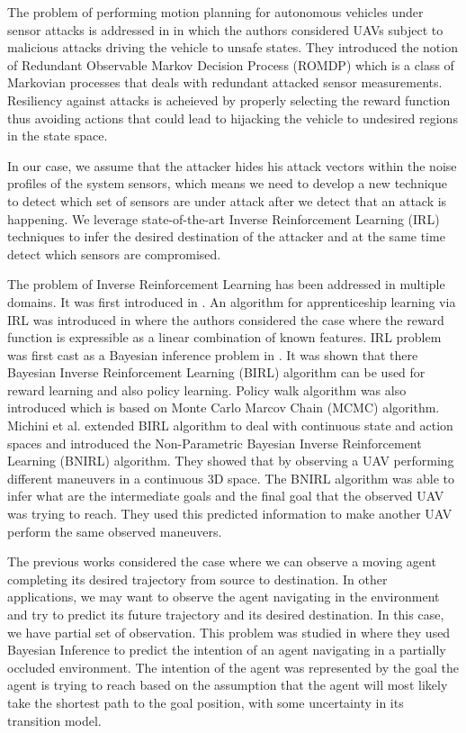 \documentclass[letterpaper, 10 pt, conference]{ieeeconf}  %
\begin{document}
The problem of performing motion planning for autonomous vehicles under sensor attacks is addressed in \cite{bezzo2016stochastic} in which the authors considered UAVs subject to malicious attacks driving the vehicle to unsafe states. They introduced the notion of Redundant Observable Markov Decision Process (ROMDP) which is a class of Markovian processes that deals with redundant attacked sensor measurements. Resiliency against attacks is acheieved by properly selecting the reward function thus avoiding actions that could lead to hijacking the vehicle to undesired regions in the state space.

In our case, we assume that the attacker hides his attack vectors within the noise profiles of the system sensors, which means we need to develop a new technique to detect which set of sensors are under attack after we detect that an attack is happening. We leverage state-of-the-art Inverse Reinforcement Learning (IRL) techniques to infer the desired destination of the attacker and at the same time detect which sensors are compromised.

The problem of Inverse Reinforcement Learning has been addressed in multiple domains. It was first introduced in \cite{Ng2000}. An algorithm for apprenticeship learning via IRL was introduced in \cite{Abbeel2004a} where the authors considered the case where the reward function is expressible as a linear combination of known features. IRL problem was first cast as a Bayesian inference problem in  \cite{Ramachandran2007}. It was shown that there Bayesian Inverse Reinforcement Learning (BIRL) algorithm can be used for reward learning and also policy learning. Policy walk algorithm was also introduced which is based on Monte Carlo Marcov Chain (MCMC) algorithm. Michini et al. \cite{Michini2015,Michini2013,Michini2012} extended BIRL algorithm to deal with continuous state and action spaces and introduced the Non-Parametric Bayesian Inverse Reinforcement Learning (BNIRL) algorithm. They  showed that by observing a UAV performing different maneuvers in a continuous 3D space. The BNIRL algorithm was able to infer what are the intermediate goals and the final goal that the observed UAV was trying to reach. They used this predicted information to make another UAV perform the same observed maneuvers.

The previous works considered the case where we can observe a moving agent completing its desired trajectory from source to destination. In other applications, we may want to observe the agent navigating in the environment and try to predict its future trajectory and its desired destination. In this case, we have partial set of observation. This problem was studied in \cite{Best2015} where they used Bayesian Inference to predict the intention of an agent navigating in a partially occluded environment. The intention of the agent was represented by the goal the agent is trying to reach based on the assumption that the agent will most likely take the shortest path to the goal position, with some uncertainty in its transition model.
\end{document}

